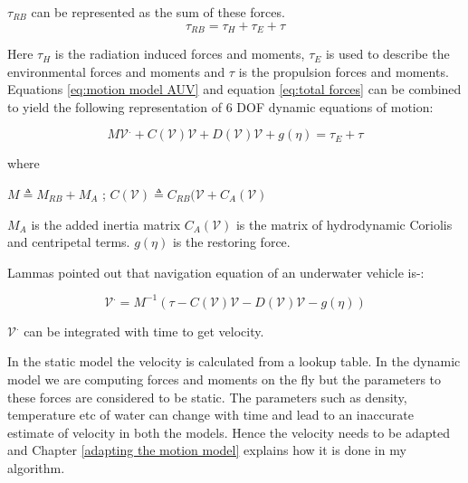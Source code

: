\documentclass[12pt,draft]{dalcsthesis}
\begin{document}
$\tau_{RB}$ can be represented as the sum of these forces.
\begin{equation}
\label{eq:total forces}
 \tau_{RB} = \tau_{H} + \tau_{E} + \tau 
\end{equation}

Here $\tau_{H}$ is the radiation induced forces and moments, $\tau_{E}$ is used to describe the environmental forces and moments and $\tau$ is the propulsion forces and moments. Equations \ref{eq:motion model AUV} and equation \ref{eq:total forces} can be combined to yield the following representation of 6 DOF dynamic equations of motion:
 

\begin{equation}
\label{eq:vehicle hydrodynamics}
M\mathcal{{V}}^{.}+C(\mathcal{V})\mathcal{V}+D(\mathcal{V})\mathcal{V}+g(\eta)=\tau_{E}+\tau%
\end{equation}

where 

$M \triangleq M_{RB} + M_{A}$ ; $C(\mathcal{V}) \triangleq C_{RB}(\mathcal{V} + C_{A}(\mathcal{V})$

$M_A$ is the added inertia  matrix $C_{A}(\mathcal{V})$ is the matrix of hydrodynamic Coriolis and centripetal terms. $g(\eta)$ is the restoring force.

Lammas \cite{Lammas2004} pointed out that navigation equation of an underwater vehicle is-:

\begin{equation}
\label{eq-: navigation equation for AUV}
\mathcal{V}^{.} = M^{-1}(\tau-C(\mathcal{V})\mathcal{V}-D(\mathcal{V})\mathcal{V}-g(\eta))
\end{equation}


$\mathcal{V}^{.}$ can be integrated with time to get velocity.

In the static model the velocity is calculated from a lookup table. In the dynamic model we are computing forces and moments on the fly but the parameters to these forces are considered to be static. The parameters such as density, temperature etc of water can change with time and lead to an inaccurate estimate of velocity in both the models. Hence the velocity needs to be adapted and Chapter \ref{adapting the motion model} explains how it is done in my algorithm.    
\end{document}
